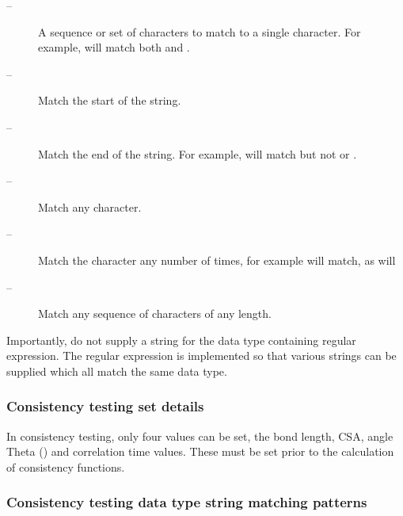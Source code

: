  \begin{description} 
 \item[\quotecmd{[]} --]  A sequence or set of characters to match to a single character.  For example,  will match both  and .  
 \item[\quotecmd{\^{}} --]  Match the start of the string.  
 \item[\quotecmd{\$} --]  Match the end of the string.  For example,  will match  but not  or .  
 \item[ --]  Match any character.  
 \item[ --]  Match the character  any number of times, for example  will match, as will   
 \item[ --]  Match any sequence of characters of any length.  
 \end{description} 
  

 Importantly, do not supply a string for the data type containing regular expression.  The regular expression is implemented so that various strings can be supplied which all match the same data type. 
  

  
 \subsubsection{Consistency testing set details} 

 In consistency testing, only four values can be set, the bond length, CSA, angle Theta () and correlation time values. These must be set prior to the calculation of consistency functions. 
  

  
 \subsubsection{Consistency testing data type string matching patterns} 

